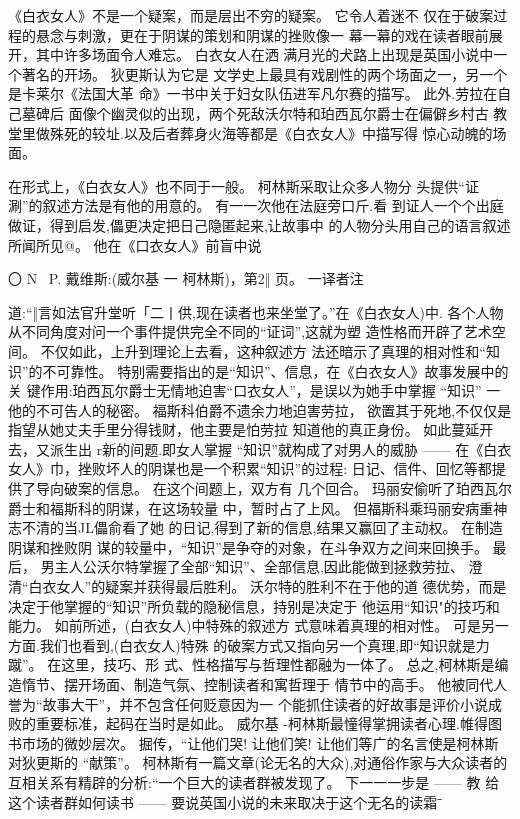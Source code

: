 \documentclass[portrait,a4paper]{article}
\begin{document}
《白衣女人》不是一个疑案，而是层出不穷的疑案。 它令人着迷不
仅在于破案过程的悬念与刺激，更在于阴谋的策划和阴谋的挫败像一
幕一幕的戏在读者眼前展开，其中许多场面令人难忘。 白衣女人在洒
满月光的犬路上出现是英国小说中一个著名的开场。 狄更斯认为它是
文学史上最具有戏剧性的两个场面之一，另一个是卡莱尔《法国大革
命》一书中关于妇女队伍进军凡尔赛的描写。 此外.劳拉在自己墓碑后
面像个幽灵似的出现，两个死敌沃尔特和珀西瓦尔爵士在偏僻乡村古
教堂里做殊死的较址.以及后者葬身火海等都是《白衣女人》中描写得
惊心动魄的场面。

在形式上，《白衣女人》也不同于一般。 柯林斯采取让众多人物分
头提供“证涮”的叙述方法是有他的用意的。 有一一次他在法庭旁口斤.看
到证人一个个出庭做证，得到启发,儡更决定把日己隐匿起来,让故事中
的人物分头用自己的语言叙述所闻所见@。 他在《口衣女人》前盲中说

〇 N~ P. 戴维斯:(威尔基 一 柯林斯)，第2‖ 页。 一译者注

道:“‖言如法官升堂听「二丨供,现在读者也来坐堂了。”在《白衣女人)中.
各个人物从不同角度对问一个事件提供完全不同的“证词”,这就为塑
造性格而开辟了艺术空间。 不仅如此，上升到理论上去看，这种叙述方
法还暗示了真理的相对性和“知识”的不可靠性。
特别需要指出的是“知识”、信息，在《白衣女人》故事发展中的关
键作用:珀西瓦尔爵士无情地迫害“口衣女人”，是误以为她手中掌握
“知识” 一他的不可告人的秘密。 福斯科伯爵不遗余力地迫害劳拉，
欲置其于死地,不仅仅是指望从她丈夫手里分得钱财，他主要是怕劳拉
知道他的真正身份。 如此蔓延开去，又派生出 r新的间题.即女人掌握
“知识”就构成了对男人的威胁 ------
在《白衣女人》巾，挫败坏人的阴谋也是一个积累“知识”的过程:
日记、信件、回忆等都提供了导向破案的信息。 在这个间题上，双方有
几个回合。 玛丽安偷听了珀西瓦尔爵士和福斯科的阴谋，在这场较量
中，暂时占了上风。 但福斯科乘玛丽安病重神志不清的当JL儡俞看了她
的日记,得到了新的信息,结果又赢回了主动权。 在制造阴谋和挫败阴
谋的较量中，“知识”是争夺的对象，在斗争双方之间来回换手。 最后，
男主人公沃尔特掌握了全部“知识”、全部信息,因此能做到拯救劳拉、
澄清“白衣女人”的疑案并获得最后胜利。 沃尔特的胜利不在于他的道
德优势，而是决定于他掌握的“知识”所负载的隐秘信息，持别是决定于
他运用“知识"的技巧和能力。 如前所述，(白衣女人)中特殊的叙述方
式意味着真理的相对性。 可是另一方面.我们也看到,(白衣女人)特殊
的破案方式又指向另一个真理,即“知识就是力蹴”。 在这里，技巧、形
式、性格描写与哲理性都融为一体了。
总之,柯林斯是编造惰节、摆开场面、制造气氛、控制读者和寓哲理于
情节中的高手。 他被同代人誉为“故事大干”，并不包含任何贬意因为一
个能抓住读者的好故事是评价小说成败的重要标准，起码在当时是如此。
威尔基 -柯林斯最憧得掌拥读者心理.帷得图书市场的微妙层次。
掘传，“让他们哭! 让他们笑! 让他们等广的名言使是柯林斯对狄更斯的
“献策”。 柯林斯有一篇文章(论无名的大众),对通俗作家与大众读者的
互相关系有精辟的分析:“一个巨大的读者群被发现了。 下一一一步是 ------ 教
给这个读者群如何读书 ------ 要说英国小说的未来取决于这个无名的读霜ˉ
\end{document}

